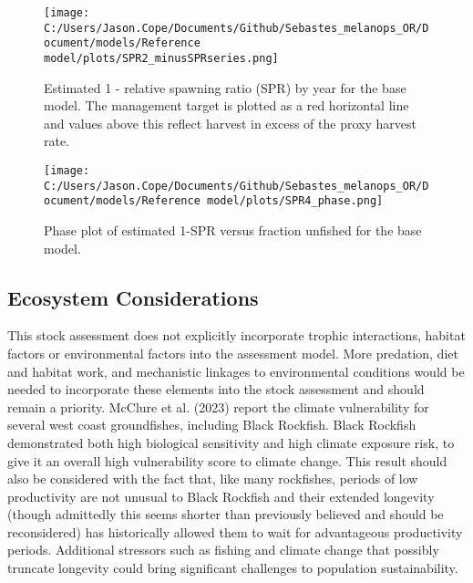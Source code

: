 \documentclass[11pt,
  english,
  letterpaper,
]{article}
\begin{document}


\begin{figure}
\centering
\texttt{[image: C:/Users/Jason.Cope/Documents/Github/Sebastes\_melanops\_OR/Document/models/Reference model/plots/SPR2\_minusSPRseries.png]}
\caption{Estimated 1 - relative spawning ratio (SPR) by year for the base model. The management target is plotted as a red horizontal line and values above this reflect harvest in excess of the proxy harvest rate.\label{fig:es-1-spr}}
\end{figure}

\begin{figure}
\centering
\texttt{[image: C:/Users/Jason.Cope/Documents/Github/Sebastes\_melanops\_OR/Document/models/Reference model/plots/SPR4\_phase.png]}
\caption{Phase plot of estimated 1-SPR versus fraction unfished for the base model.\label{fig:es-phase}}
\end{figure}

\clearpage

\hypertarget{ecosystem-considerations}{%
\subsection*{Ecosystem Considerations}\label{ecosystem-considerations}}

This stock assessment does not explicitly incorporate trophic interactions, habitat factors or environmental factors into the assessment model. More predation, diet and habitat work, and mechanistic linkages to environmental conditions would be needed to incorporate these elements into the stock assessment and should remain a priority. McClure et al. (2023) report the climate vulnerability for several west coast groundfishes, including Black Rockfish. Black Rockfish demonstrated both high biological sensitivity and high climate exposure risk, to give it an overall high vulnerability score to climate change. This result should also be considered with the fact that, like many rockfishes, periods of low productivity are not unusual to Black Rockfish and their extended longevity (though admittedly this seems shorter than previously believed and should be reconsidered) has historically allowed them to wait for advantageous productivity periods. Additional stressors such as fishing and climate change that possibly truncate longevity could bring significant challenges to population sustainability.
\end{document}
